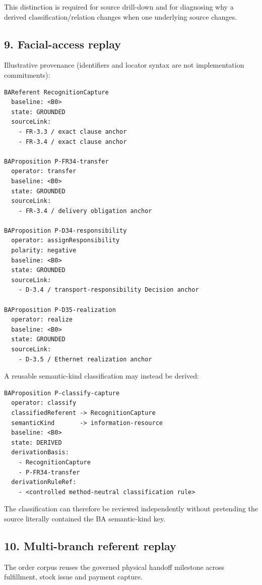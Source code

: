 \documentclass[11pt,a4paper]{article}
\begin{document}
This distinction is required for source drill-down and for diagnosing why a derived classification/relation changes when one underlying source changes.

\subsection{9. Facial-access replay}\label{9-facial-access-replay}

Illustrative provenance (identifiers and locator syntax are not implementation commitments):

\begin{verbatim}
BAReferent RecognitionCapture
  baseline: <B0>
  state: GROUNDED
  sourceLink:
    - FR-3.3 / exact clause anchor
    - FR-3.4 / exact clause anchor

BAProposition P-FR34-transfer
  operator: transfer
  baseline: <B0>
  state: GROUNDED
  sourceLink:
    - FR-3.4 / delivery obligation anchor

BAProposition P-D34-responsibility
  operator: assignResponsibility
  polarity: negative
  baseline: <B0>
  state: GROUNDED
  sourceLink:
    - D-3.4 / transport-responsibility Decision anchor

BAProposition P-D35-realization
  operator: realize
  baseline: <B0>
  state: GROUNDED
  sourceLink:
    - D-3.5 / Ethernet realization anchor
\end{verbatim}

A reusable semantic-kind classification may instead be derived:

\begin{verbatim}
BAProposition P-classify-capture
  operator: classify
  classifiedReferent -> RecognitionCapture
  semanticKind       -> information-resource
  baseline: <B0>
  state: DERIVED
  derivationBasis:
    - RecognitionCapture
    - P-FR34-transfer
  derivationRuleRef:
    - <controlled method-neutral classification rule>
\end{verbatim}

The classification can therefore be reviewed independently without pretending the source literally contained the BA semantic-kind key.

\subsection{10. Multi-branch referent replay}\label{10-multi-branch-referent-replay}

The order corpus reuses the governed physical handoff milestone across fulfillment, stock issue and payment capture.
\end{document}
